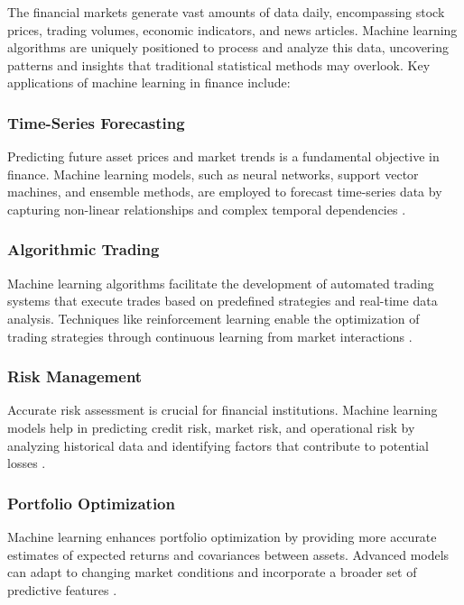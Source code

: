 The financial markets generate vast amounts of data daily, encompassing stock prices, trading volumes, economic indicators, and news articles. Machine learning algorithms are uniquely positioned to process and analyze this data, uncovering patterns and insights that traditional statistical methods may overlook. Key applications of machine learning in finance include:

\subsubsection{Time-Series Forecasting}

Predicting future asset prices and market trends is a fundamental objective in finance. Machine learning models, such as neural networks, support vector machines, and ensemble methods, are employed to forecast time-series data by capturing non-linear relationships and complex temporal dependencies \cite{sezer2020financial}.

\subsubsection{Algorithmic Trading}

Machine learning algorithms facilitate the development of automated trading systems that execute trades based on predefined strategies and real-time data analysis. Techniques like reinforcement learning enable the optimization of trading strategies through continuous learning from market interactions \cite{nevmyvaka2006reinforcement}.

\subsubsection{Risk Management}

Accurate risk assessment is crucial for financial institutions. Machine learning models help in predicting credit risk, market risk, and operational risk by analyzing historical data and identifying factors that contribute to potential losses \cite{lessmann2015benchmarking}.

\subsubsection{Portfolio Optimization}

Machine learning enhances portfolio optimization by providing more accurate estimates of expected returns and covariances between assets. Advanced models can adapt to changing market conditions and incorporate a broader set of predictive features \cite{heaton2017deep}.

